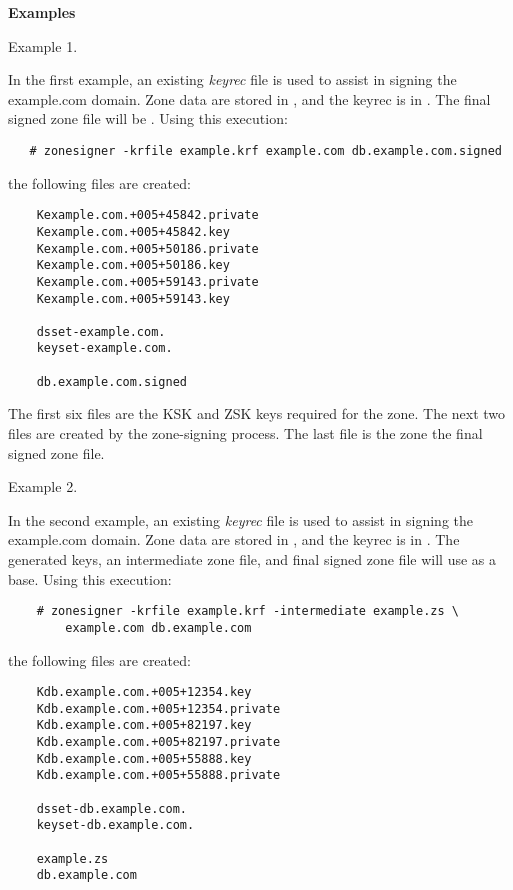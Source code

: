 {\bf Examples}

Example 1.

In the first example, an existing {\it keyrec} file is used to assist in
signing the example.com domain.  Zone data are stored in ,
and the keyrec is in .  The final signed zone file will be
.  Using this execution:

\begin{verbatim}
   # zonesigner -krfile example.krf example.com db.example.com.signed
\end{verbatim}

the following files are created:

\begin{verbatim}
    Kexample.com.+005+45842.private
    Kexample.com.+005+45842.key
    Kexample.com.+005+50186.private
    Kexample.com.+005+50186.key
    Kexample.com.+005+59143.private
    Kexample.com.+005+59143.key

    dsset-example.com.
    keyset-example.com.

    db.example.com.signed
\end{verbatim}

The first six files are the KSK and ZSK keys required for the zone.  The next
two files are created by the zone-signing process.  The last file is the zone
the final signed zone file.

Example 2.

In the second example, an existing {\it keyrec} file is used to assist in
signing the example.com domain.  Zone data are stored in ,
and the keyrec is in .  The generated keys, an intermediate
zone file, and final signed zone file will use  as a base.
Using this execution:

\begin{verbatim}
    # zonesigner -krfile example.krf -intermediate example.zs \
	    example.com db.example.com
\end{verbatim}

the following files are created:

\begin{verbatim}
    Kdb.example.com.+005+12354.key
    Kdb.example.com.+005+12354.private
    Kdb.example.com.+005+82197.key
    Kdb.example.com.+005+82197.private
    Kdb.example.com.+005+55888.key
    Kdb.example.com.+005+55888.private

    dsset-db.example.com.
    keyset-db.example.com.

    example.zs
    db.example.com
\end{verbatim}

